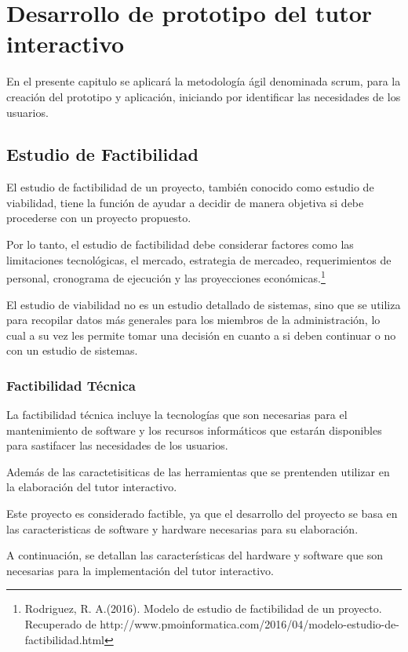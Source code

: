 \documentclass[12pt]{report}%
\begin{document}
\newpage
\chapter{Desarrollo de prototipo del tutor interactivo}
\newpage

\newpage
En el presente capitulo se aplicará la metodología ágil denominada scrum, para la creación del prototipo y aplicación, iniciando por identificar las necesidades de los usuarios.
\section{Estudio de Factibilidad}

El estudio de factibilidad de un proyecto, también conocido como estudio de viabilidad, tiene la función de ayudar a decidir de manera objetiva si debe procederse con un proyecto propuesto.

Por lo tanto, el estudio de factibilidad debe considerar factores como las limitaciones tecnológicas, el mercado, estrategia de mercadeo, requerimientos de personal, cronograma de ejecución y las proyecciones económicas.\footnote{Rodriguez, R. A.(2016). Modelo de estudio de factibilidad de un proyecto. Recuperado de http://www.pmoinformatica.com/2016/04/modelo-estudio-de-factibilidad.html}

El estudio de viabilidad no es un estudio detallado de sistemas, sino que se utiliza para recopilar datos más generales para los miembros de la administración, lo cual a su vez les permite tomar una decisión en cuanto a si deben continuar o no con un estudio de sistemas.

\subsection{Factibilidad Técnica}

La factibilidad técnica incluye la tecnologías que son necesarias para el mantenimiento de software y los recursos informáticos que estarán disponibles para sastifacer las necesidades de los usuarios.

Además de las caractetisiticas de las herramientas que se prentenden utilizar en la elaboración del tutor interactivo.

Este proyecto es considerado factible, ya que el desarrollo del proyecto se basa en las caracteristicas de software y hardware necesarias para su elaboración.
\newpage

A continuación, se detallan las características del hardware y software que son necesarias para la implementación del tutor interactivo.
\end{document}

